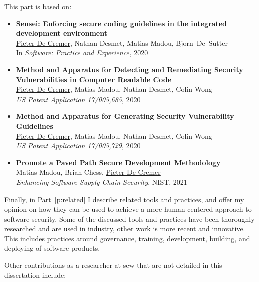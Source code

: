 This part is based on:

\begin{itemize}
 \item 
 \textbf{Sensei: Enforcing secure coding guidelines in the integrated development environment}\\
 {\small \underline{Pieter De Cremer}, Nathan Desmet, Matias Madou, \mbox{Bjorn De Sutter}\\}
 In \emph{Software: Practice and Experience}, 2020
    
 \item 
 \textbf{Method and Apparatus for Detecting and Remediating Security Vulnerabilities in Computer Readable Code}\\
 \underline{Pieter De Cremer}, Matias Madou, Nathan Desmet, Colin Wong\\
 \emph{US Patent Application 17/005,685}, 2020
 
 \item 
 \textbf{Method and Apparatus for Generating Security Vulnerability Guidelines}\\
 \underline{Pieter De Cremer}, Matias Madou, Nathan Desmet, Colin Wong\\
 \emph{US Patent Application 17/005,729}, 2020
 
 \item 
 \textbf{Promote a Paved Path Secure Development Methodology}\\
 Matias Madou, Brian Chess, \underline{Pieter De Cremer}\\
 \emph{Enhancing Software Supply Chain Security}, NIST, 2021
\end{itemize}

Finally, in Part~\ref{p:related} I describe related tools and practices, and offer my opinion on how they can be used to achieve a more human-centered approach to software security.
Some of the discussed tools and practices have been thoroughly researched and are used in industry, other work is more recent and innovative. 
This includes practices around governance, training, development, building, and deploying of software products.

Other contributions as a researcher at 
\gls{scw} that are not detailed in this dissertation include:

